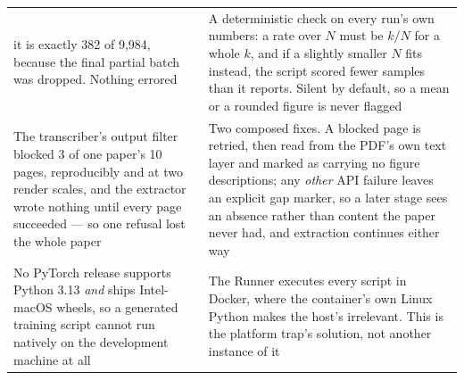 \documentclass[11pt]{article}
\begin{document}
\begin{table}[tbp]
\begin{tabular}{L{0.47\textwidth}L{0.47\textwidth}}
  it is exactly 382 of 9{,}984, because the final partial batch was dropped. Nothing errored &
  A deterministic check on every run's own numbers: a rate over $N$ must be $k/N$ for a whole
  $k$, and if a slightly smaller $N$ fits instead, the script scored fewer samples than it
  reports. Silent by default, so a mean or a rounded figure is never flagged \\
The transcriber's output filter blocked 3 of one paper's 10 pages, reproducibly and at two render
  scales, and the extractor wrote nothing until every page succeeded --- so one refusal lost the
  whole paper & Two composed fixes. A blocked page is retried, then read from the PDF's own text
  layer and marked as carrying no figure descriptions; any \emph{other} API failure leaves an
  explicit gap marker, so a later stage sees an absence rather than content the paper never had,
  and extraction continues either way \\
No PyTorch release supports Python 3.13 \emph{and} ships Intel-macOS wheels, so a generated
  training script cannot run natively on the development machine at all & The Runner executes
  every script in Docker, where the container's own Linux Python makes the host's irrelevant. This
  is the platform trap's solution, not another instance of it \\
\bottomrule
\end{tabular}
\end{table}
\end{document}
